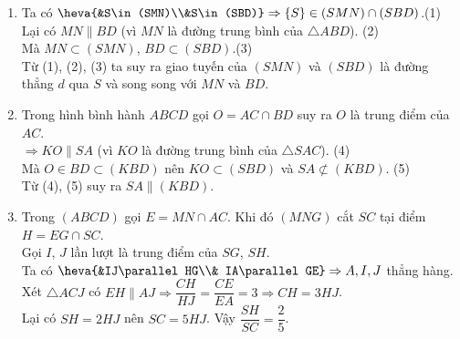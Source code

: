 \begin{bt}
{\begin{center}
\begin{tikzpicture}[scale=1,>=stealth, font=\footnotesize,line join=round,line cap=round]
		\end{tikzpicture}
	\end{center}
	\begin{enumerate}
		\item Ta có $\heva{&S\in(SMN)\\&S\in(SBD)}
			\Rightarrow \{S\}\in (SMN) \cap (SBD)$.\hfill (1)
		\\
		Lại có $MN\parallel BD$ (vì $MN$ là đường trung bình của $\triangle ABD$). \hfill (2)
		\\
		Mà $MN \subset (SMN)$, $BD\subset (SBD)$.\hfill (3)
		\\
		Từ (1), (2), (3) ta suy ra giao tuyến của $(SMN)$ và $(SBD)$ là đường thẳng $d$ qua $S$ và song song với $MN$ và $BD$.
		\item Trong hình bình hành $ABCD$ gọi $O=AC \cap BD$ suy ra $O$ là trung điểm của $AC$.
		\\
		$\Rightarrow KO \parallel SA$ (vì $KO$ là đường trung bình của $\triangle SAC$). \hfill (4)
		\\
		Mà $O\in BD \subset (KBD)$ nên $KO\subset (SBD)$ và $SA\not\subset (KBD)$.  \hfill (5)
		\\
		Từ (4), (5) suy ra $SA \parallel (KBD)$.
		\item Trong $(ABCD)$ gọi $E=MN\cap AC$. Khi đó $(MNG)$ cắt $SC$ tại điểm $H=EG\cap SC$.
		\\
		Gọi $I$, $J$ lần lượt là trung điểm của $SG$, $SH$.
		\\
		Ta có $\heva{&IJ\parallel HG\\& IA\parallel GE}\Rightarrow A,I,J$ thẳng hàng.
		\\
		Xét $\triangle ACJ$ có $EH\parallel AJ \Rightarrow \dfrac{CH}{HJ}=\dfrac{CE}{EA}=3 \Rightarrow CH=3HJ$.
		\\
		Lại có $SH=2HJ$ nên $SC=5HJ$. Vậy $\dfrac{SH}{SC}=\dfrac{2}{5}$.
	\end{enumerate}
	}
\end{bt}
